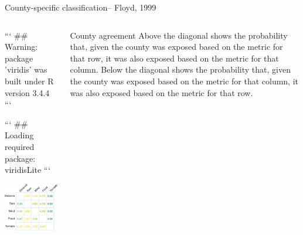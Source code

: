 \documentclass[ignorenonframetext,]{beamer}
\begin{document}
\begin{frame}{County-specific classification-- Floyd, 1999}

\begin{columns}
\begin{column}{0.6\textwidth}

```
## Warning: package 'viridis' was built under R version 3.4.4
```

```
## Loading required package: viridisLite
```


\includegraphics[width=\textwidth]{anderson_jan11_files/figure-beamer/unnamed-chunk-20-1} 
\end{column}
\begin{column}{0.4\textwidth}
\small
\begin{block}{County agreement}
Above the diagonal shows the probability that, given the county was exposed based on the metric for that row, it was also exposed based on the metric for that column. Below the diagonal shows the probability that, given the county was exposed based on the metric for that column, it was also exposed based on the metric for that row.
\end{block}
\end{column}
\end{columns}

\end{frame}
\end{document}
